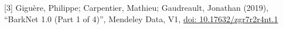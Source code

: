 \documentclass{article}
\begin{document}
[3] Giguère, Philippe; Carpentier, Mathieu; Gaudreault, Jonathan (2019), “BarkNet 1.0 (Part 1 of  4)”, Mendeley Data, V1, \url{doi: 10.17632/zgr7r2r4nt.1}



\end{document}
